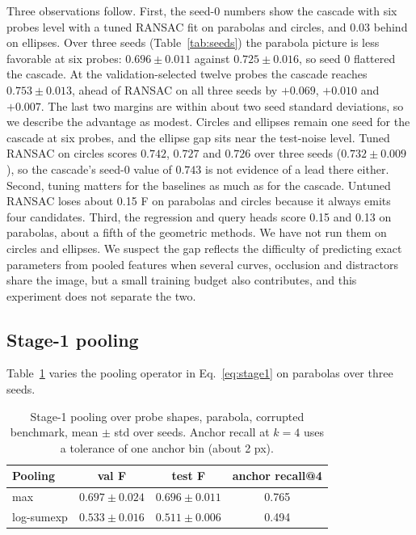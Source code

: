 \documentclass[11pt]{article}
\begin{document}
Three observations follow. First, the seed-0 numbers show the cascade with six probes level with a tuned RANSAC fit on parabolas and circles, and 0.03 behind on ellipses. Over three seeds (Table~\ref{tab:seeds}) the parabola picture is less favorable at six probes: $0.696\pm0.011$ against $0.725\pm0.016$, so seed 0 flattered the cascade. At the validation-selected twelve probes the cascade reaches $0.753\pm0.013$, ahead of RANSAC on all three seeds by $+0.069$, $+0.010$ and $+0.007$. The last two margins are within about two seed standard deviations, so we describe the advantage as modest. Circles and ellipses remain one seed for the cascade at six probes, and the ellipse gap sits near the test-noise level. Tuned RANSAC on circles scores $0.742$, $0.727$ and $0.726$ over three seeds ($0.732\pm0.009$), so the cascade's seed-0 value of $0.743$ is not evidence of a lead there either. Second, tuning matters for the baselines as much as for the cascade. Untuned RANSAC loses about 0.15 F on parabolas and circles because it always emits four candidates. Third, the regression and query heads score 0.15 and 0.13 on parabolas, about a fifth of the geometric methods. We have not run them on circles and ellipses. We suspect the gap reflects the difficulty of predicting exact parameters from pooled features when several curves, occlusion and distractors share the image, but a small training budget also contributes, and this experiment does not separate the two.

\subsection{Stage-1 pooling}
\label{sec:pooling}
Table~\ref{tab:pool} varies the pooling operator in Eq.~\ref{eq:stage1} on parabolas over three seeds.

\begin{table}[t]
\centering
\caption{Stage-1 pooling over probe shapes, parabola, corrupted benchmark, mean $\pm$ std over seeds. Anchor recall at $k=4$ uses a tolerance of one anchor bin (about 2 px).}
\label{tab:pool}
\small
\begin{tabular}{lccc}
\toprule
\textbf{Pooling} & \textbf{val F} & \textbf{test F} & \textbf{anchor recall@4} \\
\midrule
max        & $0.697\pm0.024$ & $0.696\pm0.011$ & 0.765 \\
log-sumexp & $0.533\pm0.016$ & $0.511\pm0.006$ & 0.494 \\
\bottomrule
\end{tabular}
\end{table}
\end{document}
